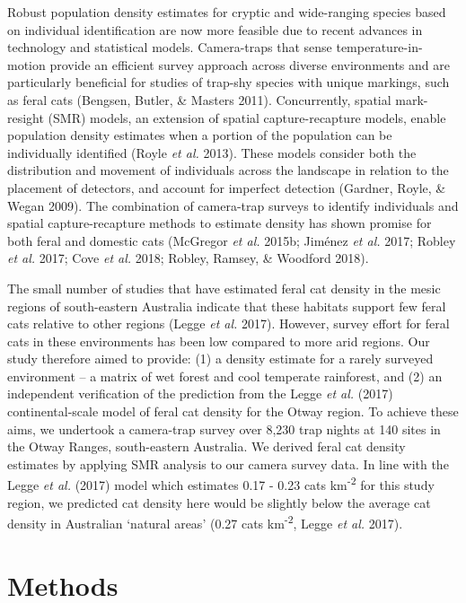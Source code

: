 \documentclass[11pt,a4paper,titlepage,twoside,openright]{style/unimelbthesis}
\begin{document}
\begin{mainmatter}
Robust population density estimates for cryptic and wide-ranging species based on individual identification are now more feasible due to recent advances in technology and statistical models. Camera-traps that sense temperature-in-motion provide an efficient survey approach across diverse environments and are particularly beneficial for studies of trap-shy species with unique markings, such as feral cats (Bengsen, Butler, \& Masters 2011). Concurrently, spatial mark-resight (SMR) models, an extension of spatial capture-recapture models, enable population density estimates when a portion of the population can be individually identified (Royle \emph{et al.} 2013). These models consider both the distribution and movement of individuals across the landscape in relation to the placement of detectors, and account for imperfect detection (Gardner, Royle, \& Wegan 2009). The combination of camera-trap surveys to identify individuals and spatial capture-recapture methods to estimate density has shown promise for both feral and domestic cats (McGregor \emph{et al.} 2015b; Jiménez \emph{et al.} 2017; Robley \emph{et al.} 2017; Cove \emph{et al.} 2018; Robley, Ramsey, \& Woodford 2018).

The small number of studies that have estimated feral cat density in the mesic regions of south-eastern Australia indicate that these habitats support few feral cats relative to other regions (Legge \emph{et al.} 2017). However, survey effort for feral cats in these environments has been low compared to more arid regions. Our study therefore aimed to provide: (1) a density estimate for a rarely surveyed environment -- a matrix of wet forest and cool temperate rainforest, and (2) an independent verification of the prediction from the Legge \emph{et al.} (2017) continental-scale model of feral cat density for the Otway region. To achieve these aims, we undertook a camera-trap survey over 8,230 trap nights at 140 sites in the Otway Ranges, south-eastern Australia. We derived feral cat density estimates by applying SMR analysis to our camera survey data. In line with the Legge \emph{et al.} (2017) model which estimates 0.17 - 0.23 cats km\textsuperscript{-2} for this study region, we predicted cat density here would be slightly below the average cat density in Australian `natural areas' (0.27 cats km\textsuperscript{-2}, Legge \emph{et al.} 2017).

\newpage

\hypertarget{methods}{%
\section{Methods}\label{methods}}


\end{mainmatter}
\end{document}
